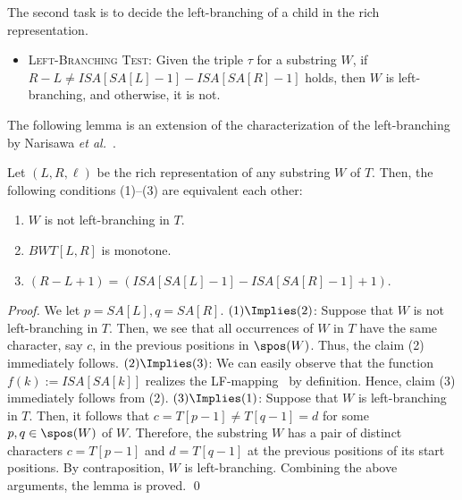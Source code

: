 The second task is to decide the left-branching of a child in the rich representation. 

\begin{itemize}\item[] 
\textsc{Left-Branching Test}:  
Given the triple $\tau$ for a substring $W$, 
if $R - L \not= ISA[SA[L]-1] - ISA[SA[R]-1]$ holds, then $W$ is left-branching, and otherwise, it is not. 
\end{itemize}


The following lemma is an extension of the characterization of the left-branching by Narisawa \textit{et al.}~\cite[Lemma~10]{narisawa2007efficient}. 

\begin{lemma}\label{lemold:leftmaximal:character}
Let $(L,R, \ell)$ be the rich representation of any substring $W$ of $T$. 
Then, the following conditions (1)--(3) are equivalent each other: 
\begin{enumerate}[(1)]
\item $W$ is not left-branching in $T$. 
\item $BWT[L, R]$ is monotone. 
\item $(R - L + 1) = (ISA[SA[L]-1] - ISA[SA[R]-1] + 1)$. 
\end{enumerate}
\end{lemma}

\begin{proof} 
We let $p = SA[L], q = SA[R]$. 
$(1)\Implies (2)$: Suppose that $W$ is not left-branching in $T$. Then, we see that all occurrences of $W$ in $T$ have the same character, say $c$, in the previous positions in $\spos(W)$. Thus, the claim (2) immediately follows. 
$(2) \Implies (3)$: We can easily observe that the function $f(k) := ISA[SA[k]]$ realizes the LF-mapping~\cite{Ferragina05:FM} by definition. Hence, claim (3) immediately follows from (2). 
$(3) \Implies (1)$: 
Suppose that $W$ is left-branching in $T$. Then, it follows that $c = T[p-1]\not= T[q-1] = d$ for some $p, q \in\spos(W)$ of $W$. 
Therefore, the substring $W$ has a pair of distinct characters $c = T[p-1]$ and $d = T[q-1]$ at the previous positions of its start positions. By contraposition, $W$ is left-branching. 
Combining the above arguments, the lemma is proved. 
\qed   
\end{proof}


